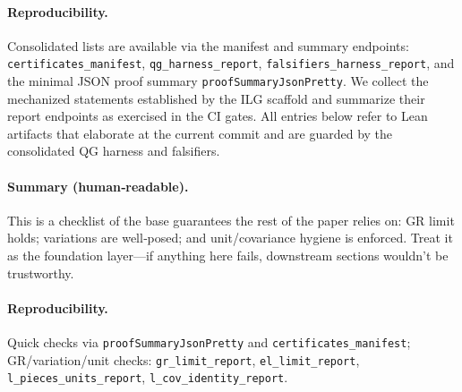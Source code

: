 \documentclass[aps,prd,twocolumn,superscriptaddress,nofootinbib,floatfix,longbibliography]{revtex4-2}
\begin{document}
\paragraph*{Reproducibility.}
Consolidated lists are available via the manifest and summary endpoints: \texttt{certificates\_manifest}, \texttt{qg\_harness\_report}, \texttt{falsifiers\_harness\_report}, and the minimal JSON proof summary \texttt{proofSummaryJsonPretty}. 
%
We collect the mechanized statements established by the ILG scaffold and summarize their report endpoints as exercised in the CI gates. All entries below refer to Lean artifacts that elaborate at the current commit and are guarded by the consolidated QG harness and falsifiers.
%
\paragraph*{Summary (human‑readable).}
This is a checklist of the base guarantees the rest of the paper relies on: GR limit holds; variations are well‑posed; and unit/covariance hygiene is enforced. Treat it as the foundation layer—if anything here fails, downstream sections wouldn’t be trustworthy.
\paragraph*{Reproducibility.}
Quick checks via \texttt{proofSummaryJsonPretty} and \texttt{certificates\_manifest}; GR/variation/unit checks: \texttt{gr\_limit\_report}, \texttt{el\_limit\_report}, \texttt{l\_pieces\_units\_report}, \texttt{l\_cov\_identity\_report}.
\end{document}
